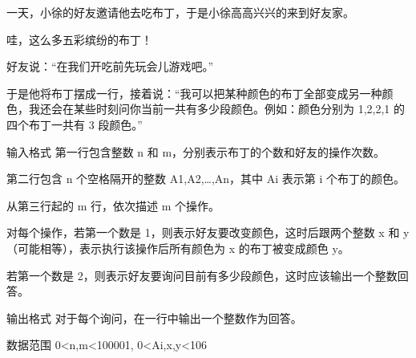 一天，小徐的好友邀请他去吃布丁，于是小徐高高兴兴的来到好友家。

哇，这么多五彩缤纷的布丁！

好友说：“在我们开吃前先玩会儿游戏吧。”

于是他将布丁摆成一行，接着说：“我可以把某种颜色的布丁全部变成另一种颜色，我还会在某些时刻问你当前一共有多少段颜色。例如：颜色分别为 1,2,2,1 的四个布丁一共有 3 段颜色。”

输入格式
第一行包含整数 n 和 m，分别表示布丁的个数和好友的操作次数。

第二行包含 n 个空格隔开的整数 A1,A2,…,An，其中 Ai 表示第 i 个布丁的颜色。

从第三行起的 m 行，依次描述 m 个操作。

对每个操作，若第一个数是 1，则表示好友要改变颜色，这时后跟两个整数 x 和 y（可能相等），表示执行该操作后所有颜色为 x 的布丁被变成颜色 y。

若第一个数是 2，则表示好友要询问目前有多少段颜色，这时应该输出一个整数回答。

输出格式
对于每个询问，在一行中输出一个整数作为回答。

数据范围
0<n,m<100001,
0<Ai,x,y<106

